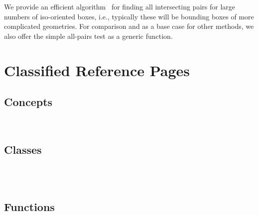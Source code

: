



We provide an efficient algorithm~\cite{cgal:ze-fsbi-02} for finding all
intersecting pairs for large numbers of iso-oriented boxes, i.e.,
typically these will be bounding boxes of more complicated geometries.
For comparison and as a base case for other methods, we also offer the
simple all-pairs test as a generic function.


\section{Classified Reference Pages}

\subsection*{Concepts}

\\

\subsection*{Classes}

\\
\\

\subsection*{Functions}

 \\

